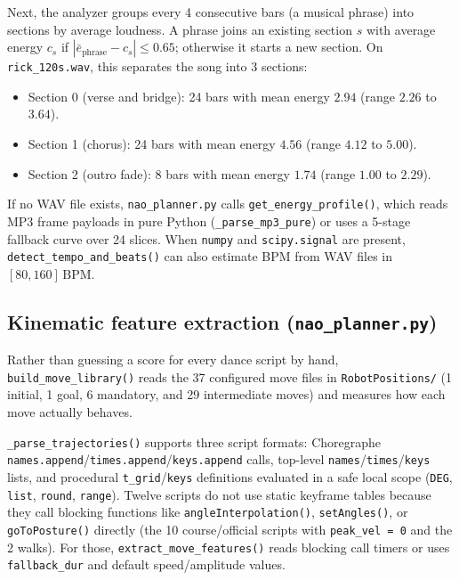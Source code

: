 \documentclass[11pt,a4paper]{article}
\newcommand{\code}[1]{\texttt{#1}}
\begin{document}
Next, the analyzer groups every 4 consecutive bars (a musical phrase) into sections by average loudness. A phrase joins an existing section $s$ with average energy $c_s$ if $|\bar{e}_{\text{phrase}} - c_s| \le 0.65$; otherwise it starts a new section. On \code{rick\_120s.wav}, this separates the song into 3 sections:
\begin{itemize}[leftmargin=1.5em]
  \item Section 0 (verse and bridge): 24 bars with mean energy $2.94$ (range $2.26$ to $3.64$).
  \item Section 1 (chorus): 24 bars with mean energy $4.56$ (range $4.12$ to $5.00$).
  \item Section 2 (outro fade): 8 bars with mean energy $1.74$ (range $1.00$ to $2.29$).
\end{itemize}
If no WAV file exists, \code{nao\_planner.py} calls \code{get\_energy\_profile()}, which reads MP3 frame payloads in pure Python (\code{\_parse\_mp3\_pure}) or uses a 5-stage fallback curve over 24 slices. When \code{numpy} and \code{scipy.signal} are present, \code{detect\_tempo\_and\_beats()} can also estimate BPM from WAV files in $[80, 160]\,\text{BPM}$.

\subsection{Kinematic feature extraction (\texorpdfstring{\code{nao\_planner.py}}{nao\_planner.py})}

Rather than guessing a score for every dance script by hand, \code{build\_move\_library()} reads the 37 configured move files in \code{RobotPositions/} (1 initial, 1 goal, 6 mandatory, and 29 intermediate moves) and measures how each move actually behaves.

\code{\_parse\_trajectories()} supports three script formats: Choregraphe \code{names.append}/\allowbreak\code{times.append}/\allowbreak\code{keys.append} calls, top-level \code{names}/\allowbreak\code{times}/\allowbreak\code{keys} lists, and procedural \code{t\_grid}/\code{keys} definitions evaluated in a safe local scope (\code{DEG}, \code{list}, \code{round}, \code{range}). Twelve scripts do not use static keyframe tables because they call blocking functions like \code{angleInterpolation()}, \code{setAngles()}, or \code{goToPosture()} directly (the 10 course/official scripts with \code{peak\_vel = 0} and the 2 walks). For those, \code{extract\_move\_features()} reads blocking call timers or uses \code{fallback\_dur} and default speed/amplitude values.
\end{document}
